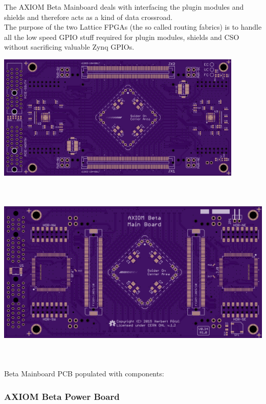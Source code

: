The AXIOM Beta Mainboard deals with interfacing the plugin modules and shields and therefore acts as a kind of data crossroad.\\

The purpose of the two Lattice FPGAs (the so called routing fabrics) is to handle all the low speed GPIO stuff required for plugin modules, shields and CSO without sacrificing valuable Zynq GPIOs.\\

\begin{center}
\includegraphics[height=6cm]{images/Beta_Main_Board_Top}
\end{center}

\begin{center}
\includegraphics[height=9cm]{images/Beta_Main_Board_Bottom}
\end{center}

Beta Mainboard PCB populated with components:\\






\subsubsection{AXIOM Beta Power Board}

